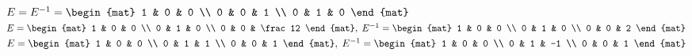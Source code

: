 \begin{Answer}
\Question $E=E^{-1} =
\begin{mat}
1 & 0 & 0 \\
0 & 0 & 1 \\
0 & 1 & 0
\end{mat}$
\Question $E=
\begin{mat}
1 & 0 & 0 \\
0 & 1 & 0 \\
0 & 0 & \frac12
\end{mat},\;
E^{-1} =
\begin{mat}
1 & 0 & 0 \\
0 & 1 & 0 \\
0 & 0 & 2
\end{mat}$
\Question $E=
\begin{mat}
1 & 0 & 0 \\
0 & 1 & 1 \\
0 & 0 & 1
\end{mat},\;
E^{-1} =
\begin{mat}
1 & 0 & 0 \\
0 & 1 & -1 \\
0 & 0 & 1
\end{mat}$
\end{Answer}
